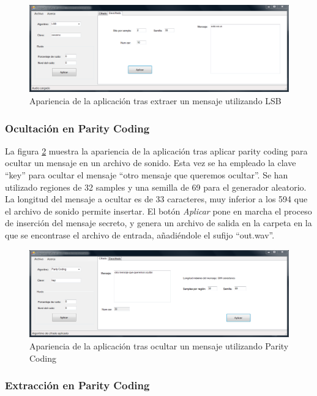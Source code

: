 \documentclass[12pt]{article}
\begin{document}
\begin{figure}[h]
  \centering
    \includegraphics[width=\textwidth]{img/ss3}
  \caption{Apariencia de la aplicación tras extraer un mensaje utilizando LSB}
  \label{ss3}
\end{figure}

\subsubsection{Ocultación en Parity Coding}

La figura \ref{ss4} muestra la apariencia de la aplicación tras aplicar parity coding para ocultar un mensaje en un archivo de sonido. Esta vez se ha empleado la clave ``key'' para ocultar el mensaje ``otro mensaje que queremos ocultar''. Se han utilizado regiones de 32 samples y una semilla de 69 para el generador aleatorio. La longitud del mensaje a ocultar es de 33 caracteres, muy inferior a los 594 que el archivo de sonido permite insertar. El botón \emph{Aplicar} pone en marcha el proceso de inserción del mensaje secreto, y genera un archivo de salida en la carpeta en la que se encontrase el archivo de entrada, añadiéndole el sufijo ``out.wav''.

\begin{figure}[h]
  \centering
    \includegraphics[width=\textwidth]{img/ss4}
  \caption{Apariencia de la aplicación tras ocultar un mensaje utilizando Parity Coding}
  \label{ss4}
\end{figure}

\subsubsection{Extracción en Parity Coding}
\end{document}
